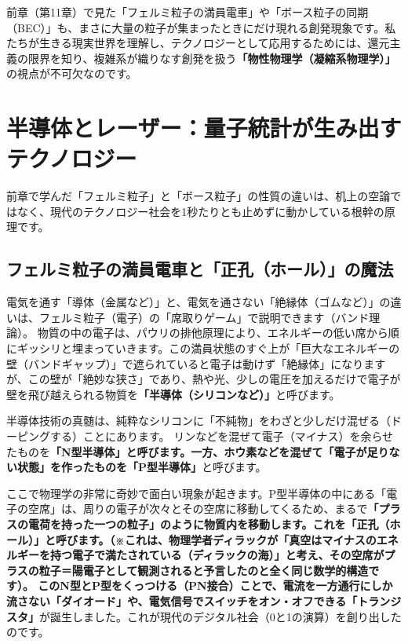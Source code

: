 前章（第11章）で見た「フェルミ粒子の満員電車」や「ボース粒子の同期（BEC）」も、まさに大量の粒子が集まったときにだけ現れる創発現象です。私たちが生きる現実世界を理解し、テクノロジーとして応用するためには、還元主義の限界を知り、複雑系が織りなす創発を扱う\textbf{「物性物理学（凝縮系物理学）」}の視点が不可欠なのです。

\section{半導体とレーザー：量子統計が生み出すテクノロジー}

前章で学んだ「フェルミ粒子」と「ボース粒子」の性質の違いは、机上の空論ではなく、現代のテクノロジー社会を1秒たりとも止めずに動かしている根幹の原理です。

\subsection{フェルミ粒子の満員電車と「正孔（ホール）」の魔法}

電気を通す「導体（金属など）」と、電気を通さない「絶縁体（ゴムなど）」の違いは、フェルミ粒子（電子）の「席取りゲーム」で説明できます（バンド理論）。 物質の中の電子は、パウリの排他原理により、エネルギーの低い席から順にギッシリと埋まっていきます。この満員状態のすぐ上が「巨大なエネルギーの壁（バンドギャップ）」で遮られていると電子は動けず「絶縁体」になりますが、この壁が「絶妙な狭さ」であり、熱や光、少しの電圧を加えるだけで電子が壁を飛び越えられる物質を\textbf{「半導体（シリコンなど）」}と呼びます。

半導体技術の真髄は、純粋なシリコンに「不純物」をわざと少しだけ混ぜる（ドーピングする）ことにあります。 リンなどを混ぜて電子（マイナス）を余らせたものを\textbf{「N型半導体」と呼びます。一方、ホウ素などを混ぜて「電子が足りない状態」を作ったものを「P型半導体」}と呼びます。

ここで物理学の非常に奇妙で面白い現象が起きます。P型半導体の中にある「電子の空席」は、周りの電子が次々とその空席に移動してくるため、まるで\textbf{「プラスの電荷を持った一つの粒子」のように物質内を移動します。これを「正孔（ホール）」と呼びます。（※これは、物理学者ディラックが「真空はマイナスのエネルギーを持つ電子で満たされている（ディラックの海）」と考え、その空席がプラスの粒子＝陽電子として観測されると予言したのと全く同じ数学的構造です）。 このN型とP型をくっつける（PN接合）ことで、電流を一方通行にしか流さない「ダイオード」や、電気信号でスイッチをオン・オフできる「トランジスタ」}が誕生しました。これが現代のデジタル社会（0と1の演算）を創り出したのです。


